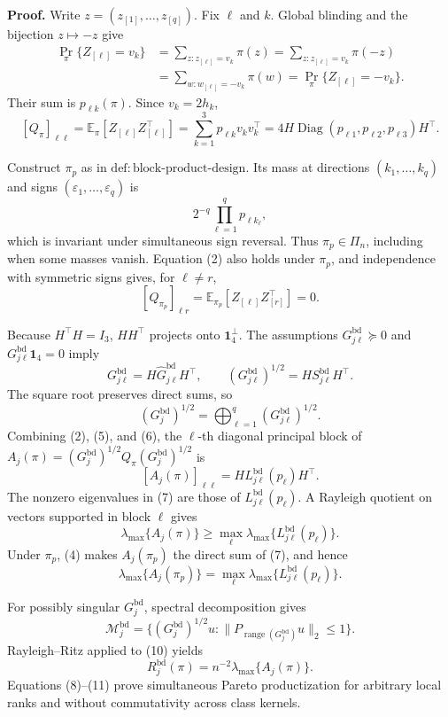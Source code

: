 \textbf{Proof.}
Write \(z=(z_{[1]},\ldots,z_{[q]})\).  Fix \(\ell\) and \(k\).  Global blinding and the bijection \(z\mapsto-z\) give
\[
\begin{aligned}
\Pr_\pi\{Z_{[\ell]}=v_k\}
&=\sum_{z:z_{[\ell]}=v_k}\pi(z)
=\sum_{z:z_{[\ell]}=v_k}\pi(-z)\\
&=\sum_{w:w_{[\ell]}=-v_k}\pi(w)
=\Pr_\pi\{Z_{[\ell]}=-v_k\}.
\end{aligned}
\tag{1}
\]
Their sum is \(p_{\ell k}(\pi)\).  Since \(v_k=2h_k\),
\[
[Q_\pi]_{\ell\ell}
=\mathbb E_\pi[Z_{[\ell]}Z_{[\ell]}^\top]
=\sum_{k=1}^3p_{\ell k}v_kv_k^\top
=4H\operatorname{Diag}(p_{\ell1},p_{\ell2},p_{\ell3})H^\top.
\tag{2}
\]

Construct \(\pi_p\) as in \(\mathrm{def:block\text{-}product\text{-}design}\).  Its mass at directions \((k_1,\ldots,k_q)\) and signs \((\varepsilon_1,\ldots,\varepsilon_q)\) is
\[
2^{-q}\prod_{\ell=1}^qp_{\ell k_\ell},
\tag{3}
\]
which is invariant under simultaneous sign reversal.  Thus \(\pi_p\in\Pi_n\), including when some masses vanish.  Equation (2) also holds under \(\pi_p\), and independence with symmetric signs gives, for \(\ell\ne r\),
\[
[Q_{\pi_p}]_{\ell r}
=\mathbb E_{\pi_p}[Z_{[\ell]}Z_{[r]}^\top]=0.
\tag{4}
\]

Because \(H^\top H=I_3\), \(HH^\top\) projects onto \(\mathbf1_4^\perp\).  The assumptions \(G^{\mathrm{bd}}_{j\ell}\succeq0\) and \(G^{\mathrm{bd}}_{j\ell}\mathbf1_4=0\) imply
\[
G^{\mathrm{bd}}_{j\ell}
=H\widehat G^{\mathrm{bd}}_{j\ell}H^\top,
\qquad
(G^{\mathrm{bd}}_{j\ell})^{1/2}
=HS^{\mathrm{bd}}_{j\ell}H^\top.
\tag{5}
\]
The square root preserves direct sums, so
\[
(G_j^{\mathrm{bd}})^{1/2}
=\bigoplus_{\ell=1}^q(G^{\mathrm{bd}}_{j\ell})^{1/2}.
\tag{6}
\]
Combining (2), (5), and (6), the \(\ell\)-th diagonal principal block of
\(A_j(\pi)=(G_j^{\mathrm{bd}})^{1/2}Q_\pi(G_j^{\mathrm{bd}})^{1/2}\) is
\[
[A_j(\pi)]_{\ell\ell}
=H L^{\mathrm{bd}}_{j\ell}(p_\ell)H^\top.
\tag{7}
\]
The nonzero eigenvalues in (7) are those of \(L^{\mathrm{bd}}_{j\ell}(p_\ell)\).  A Rayleigh quotient on vectors supported in block \(\ell\) gives
\[
\lambda_{\max}\{A_j(\pi)\}
\ge\max_\ell\lambda_{\max}\{L^{\mathrm{bd}}_{j\ell}(p_\ell)\}.
\tag{8}
\]
Under \(\pi_p\), (4) makes \(A_j(\pi_p)\) the direct sum of (7), and hence
\[
\lambda_{\max}\{A_j(\pi_p)\}
=\max_\ell\lambda_{\max}\{L^{\mathrm{bd}}_{j\ell}(p_\ell)\}.
\tag{9}
\]

For possibly singular \(G_j^{\mathrm{bd}}\), spectral decomposition gives
\[
\mathcal M_j^{\mathrm{bd}}
=\{(G_j^{\mathrm{bd}})^{1/2}u:
\|P_{\operatorname{range}(G_j^{\mathrm{bd}})}u\|_2\le1\}.
\tag{10}
\]
Rayleigh--Ritz applied to (10) yields
\[
R_j^{\mathrm{bd}}(\pi)
=n^{-2}\lambda_{\max}\{A_j(\pi)\}.
\tag{11}
\]
Equations (8)--(11) prove simultaneous Pareto productization for arbitrary local ranks and without commutativity across class kernels.

